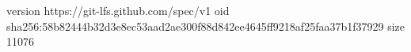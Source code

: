 version https://git-lfs.github.com/spec/v1
oid sha256:58b82444b32d3e8ec53aad2ae300f88d842ee4645ff9218af25faa37b1f37929
size 11076
